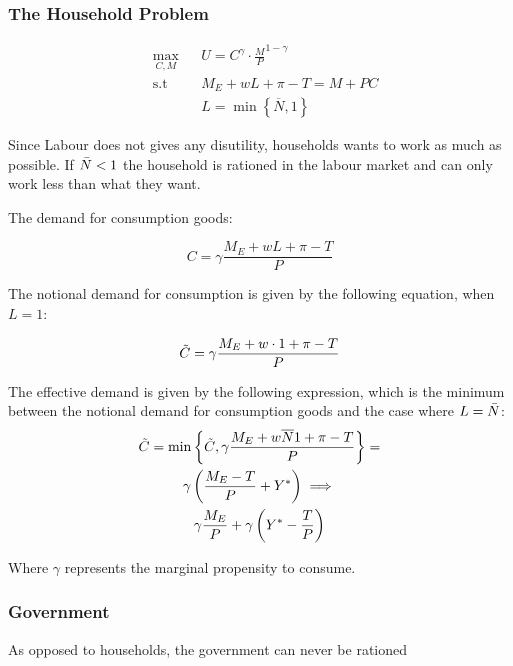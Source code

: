 \subsubsection*{The Household Problem}

\begin{equation*}
\begin{aligned}
& \underset{C, M}{\max}
& & U = C ^{\gamma} \cdot \frac{M}{P}^{1 - \gamma} \\
& \text{s.t}
& & M_E + wL + \pi -T = M + PC \\
& & &  L  = \min \left\{ \overline { N }  , 1 \right\}
\end{aligned}
\end{equation*}

Since Labour does not gives any disutility, households wants to work as much as possible. If $\Bar{N} < 1$ the household is rationed in the labour market and can only work less than what they want. 


The demand for consumption goods:

\begin{equation}
    C = \gamma \frac{M_E + wL + \pi -T}{P}
\end{equation}

The notional demand for consumption is given by the following equation, when $L = 1$:

\begin{equation}
   \Tilde{C} = \gamma \frac{M_E + w \cdot 1 + \pi -T}{P}
\end{equation}


The effective demand is given by the following expression, which is the minimum between the notional demand for consumption goods and the case where $L = \Bar{N}$:
\begin{multline}
    \Tilde{C} = \min \left\{ \Tilde{C}, \gamma \frac{M_E + w \overline{N} 1 + \pi -T}{P} \right\} = \\
      \gamma \left( \frac{M_E - T}{P} + Y^* \right) \implies \\
     \gamma \frac{M_E}{P} + \gamma \left( Y^* - \frac{T}{P} \right)
\end{multline}

Where $\gamma$ represents the marginal propensity to consume.


\subsubsection*{Government}
As opposed to households, the government can never be rationed

